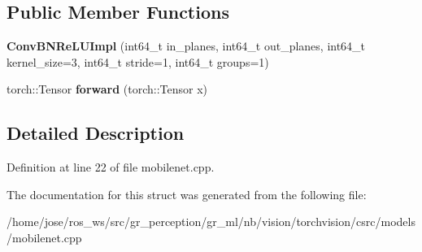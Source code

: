 \subsection*{Public Member Functions}
\begin{DoxyCompactItemize}
\item 
\mbox{\label{structvision_1_1models_1_1ConvBNReLUImpl_a4dec4dbc4d10af2be3cea4e1af883141}} 
{\bfseries Conv\+B\+N\+Re\+L\+U\+Impl} (int64\+\_\+t in\+\_\+planes, int64\+\_\+t out\+\_\+planes, int64\+\_\+t kernel\+\_\+size=3, int64\+\_\+t stride=1, int64\+\_\+t groups=1)
\item 
\mbox{\label{structvision_1_1models_1_1ConvBNReLUImpl_a7a3d8bb2ba6341f01d1b6ee7371be050}} 
torch\+::\+Tensor {\bfseries forward} (torch\+::\+Tensor x)
\end{DoxyCompactItemize}


\subsection{Detailed Description}


Definition at line 22 of file mobilenet.\+cpp.



The documentation for this struct was generated from the following file\+:\begin{DoxyCompactItemize}
\item 
/home/jose/ros\+\_\+ws/src/gr\+\_\+perception/gr\+\_\+ml/nb/vision/torchvision/csrc/models/mobilenet.\+cpp\end{DoxyCompactItemize}
